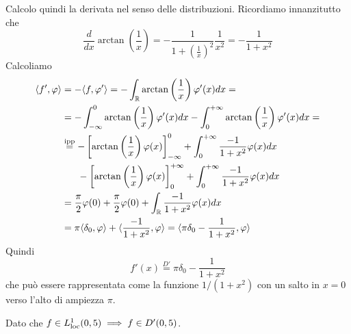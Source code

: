 Calcolo quindi la derivata nel senso delle distribuzioni. Ricordiamo innanzitutto che
\begin{equation*}
\frac{d}{dx}\arctan\left(\frac{1}{x}\right) =-\frac{1}{1+\left(\frac{1}{x}\right)^{2}}\frac{1}{x^{2}} =-\frac{1}{1+x^{2}}
\end{equation*}
Calcoliamo
\begin{align*}
\langle f',\varphi \rangle  & =-\langle f,\varphi '\rangle =-\int _{\mathbb{R} }\arctan\left(\frac{1}{x}\right) \varphi '(x)dx=\\
 & =-\int ^{0}_{-\infty }\arctan\left(\frac{1}{x}\right) \varphi '(x)dx-\int ^{+\infty }_{0}\arctan\left(\frac{1}{x}\right) \varphi '(x)dx=\\
 & \overset{\text{ipp}}{=} -\left[\arctan\left(\frac{1}{x}\right) \varphi (x)\right]^{0}_{-\infty } +\int ^{+\infty }_{0}\frac{-1}{1+x^{2}} \varphi ( x) dx\\
 & \ \ \ \ \ -\left[\arctan\left(\frac{1}{x}\right) \varphi (x)\right]^{+\infty }_{0} +\int ^{+\infty }_{0}\frac{-1}{1+x^{2}} \varphi ( x) dx\\
 & =\frac{\pi }{2} \varphi ( 0) +\frac{\pi }{2} \varphi ( 0) +\int _{\mathbb{R} }\frac{-1}{1+x^{2}} \varphi (x)dx\\
 & =\pi \langle \delta _{0} ,\varphi \rangle +\langle \frac{-1}{1+x^{2}} ,\varphi \rangle =\langle \pi \delta _{0} -\frac{1}{1+x^{2}} ,\varphi \rangle 
\end{align*}
Quindi
\begin{equation*}
f'(x)\overset{D'}{=} \pi \delta _{0} -\frac{1}{1+x^{2}}
\end{equation*}
che può essere rappresentata come la funzione $1/\left( 1+x^{2}\right)$ con un salto in $x=0$ verso l'alto di ampiezza $\pi $.
\Soluzione

Dato che $f\in L^{1}_{\operatorname{loc}} (0,5)\implies f\in D'(0,5)$.


